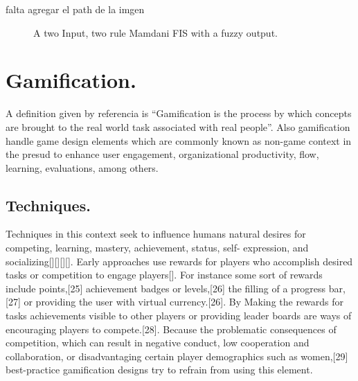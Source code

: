 falta agregar el path de la imgen

\begin{figure}
\captionsetup{justification=centering,margin=2cm}
\centering
\setlength\fboxsep{0pt}
\setlength\fboxrule{0.7pt}
\caption{A two Input, two rule Mamdani FIS with a fuzzy output.}
\label{fig:fuzzyOut}       
\end{figure}


\section{Gamification.}

A definition given by  referencia is  “Gamification is the process by which
concepts are brought to the real world task associated with real people”. Also
gamification handle game design elements which are commonly known as non-game
context in the presud to  enhance user engagement, organizational productivity,
flow, learning, evaluations, among others.

\subsection{Techniques.}   
Techniques in this context seek to influence humans
natural desires for competing, learning, mastery,  achievement, status, self-
expression, and socializing[][][][]. Early approaches use rewards for players
who accomplish desired tasks or competition to engage players[]. For instance
some sort of rewards include points,[25] achievement badges or levels,[26] the
filling of a progress bar,[27] or providing the user with virtual currency.[26].
By Making the rewards for  tasks achievements visible to other players or
providing leader boards are ways of encouraging players to compete.[28]. Because
the  problematic consequences of competition, which can result in negative
conduct, low cooperation and collaboration, or disadvantaging certain player
demographics such as women,[29] best-practice gamification designs try to
refrain from using this element.

